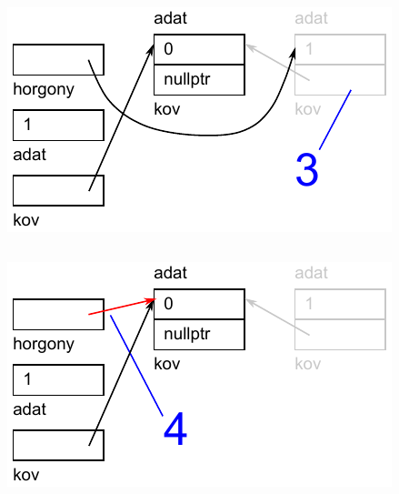 \begin{frame}
  \begin{columns}[c]
      \footnotesize
      \begin{exampleblock}{}
        
      \end{exampleblock}
      \includegraphics[width=\textwidth]{verem/verem12.pdf}
  \end{columns}
\end{frame}

\begin{frame}
  \begin{columns}[c]
      \footnotesize
      \begin{exampleblock}{}
        
      \end{exampleblock}
      \includegraphics[width=\textwidth]{verem/verem13.pdf}
  \end{columns}
\end{frame}

